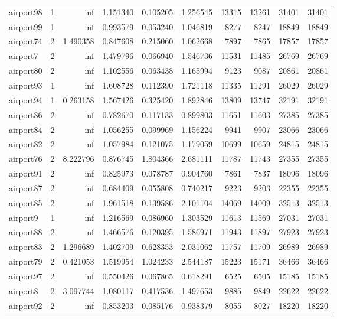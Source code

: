 \begin{longtable}{|l|r|r|r|r|r|r|r|r|r|}
airport98 & 1 & inf & 1.151340 & 0.105205 & 1.256545 & 13315 & 13261 & 31401 & 31401 \\
airport99 & 1 & inf & 0.993579 & 0.053240 & 1.046819 & 8277 & 8247 & 18849 & 18849 \\
airport74 & 2 & 1.490358 & 0.847608 & 0.215060 & 1.062668 & 7897 & 7865 & 17857 & 17857 \\
airport7 & 2 & inf & 1.479796 & 0.066940 & 1.546736 & 11531 & 11485 & 26769 & 26769 \\
airport80 & 2 & inf & 1.102556 & 0.063438 & 1.165994 & 9123 & 9087 & 20861 & 20861 \\
airport93 & 1 & inf & 1.608728 & 0.112390 & 1.721118 & 11335 & 11291 & 26029 & 26029 \\
airport94 & 1 & 0.263158 & 1.567426 & 0.325420 & 1.892846 & 13809 & 13747 & 32191 & 32191 \\
airport86 & 2 & inf & 0.782670 & 0.117133 & 0.899803 & 11651 & 11603 & 27385 & 27385 \\
airport84 & 2 & inf & 1.056255 & 0.099969 & 1.156224 & 9941 & 9907 & 23066 & 23066 \\
airport82 & 2 & inf & 1.057984 & 0.121075 & 1.179059 & 10699 & 10659 & 24815 & 24815 \\
airport76 & 2 & 8.222796 & 0.876745 & 1.804366 & 2.681111 & 11787 & 11743 & 27355 & 27355 \\
airport91 & 2 & inf & 0.825973 & 0.078787 & 0.904760 & 7861 & 7837 & 18096 & 18096 \\
airport87 & 2 & inf & 0.684409 & 0.055808 & 0.740217 & 9223 & 9203 & 22355 & 22355 \\
airport85 & 2 & inf & 1.961518 & 0.139586 & 2.101104 & 14069 & 14009 & 32513 & 32513 \\
airport9 & 1 & inf & 1.216569 & 0.086960 & 1.303529 & 11613 & 11569 & 27031 & 27031 \\
airport88 & 2 & inf & 1.466576 & 0.120395 & 1.586971 & 11943 & 11897 & 27923 & 27923 \\
airport83 & 2 & 1.296689 & 1.402709 & 0.628353 & 2.031062 & 11757 & 11709 & 26989 & 26989 \\
airport79 & 2 & 0.421053 & 1.519954 & 1.024233 & 2.544187 & 15223 & 15171 & 36466 & 36466 \\
airport97 & 2 & inf & 0.550426 & 0.067865 & 0.618291 & 6525 & 6505 & 15185 & 15185 \\
airport8 & 2 & 3.097744 & 1.080117 & 0.417536 & 1.497653 & 9885 & 9849 & 22622 & 22622 \\
airport92 & 2 & inf & 0.853203 & 0.085176 & 0.938379 & 8055 & 8027 & 18220 & 18220 \\

\end{longtable}
